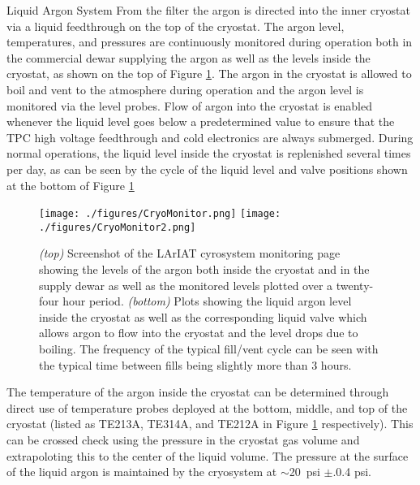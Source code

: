 \begin{subsubsection}{Liquid Argon System}
From the filter the argon is directed into the inner cryostat via a liquid feedthrough on the top of the cryostat. The argon level, temperatures, and pressures are continuously monitored during operation both in the commercial dewar supplying the argon as well as the levels inside the cryostat, as shown on the top of Figure \ref{fig:LArIATCryoMonitor}. The argon in the cryostat is allowed to boil and vent to the atmosphere during operation and the argon level is monitored via the level probes. Flow of argon into the cryostat is enabled whenever the liquid level goes below a predetermined value to ensure that the TPC high voltage feedthrough and cold electronics are always submerged. During normal operations, the liquid level inside the cryostat is replenished several times per day, as can be seen by the cycle of the liquid level and valve positions shown at the bottom of Figure \ref{fig:LArIATCryoMonitor} 

\begin{figure}[htb]
\centering
\texttt{[image: ./figures/CryoMonitor.png]}
\texttt{[image: ./figures/CryoMonitor2.png]}
\caption{\emph{(top)} Screenshot of the LArIAT cyrosystem monitoring page showing the levels of the argon both inside the cryostat and in the supply dewar as well as the monitored levels plotted over a twenty-four hour period. \emph{(bottom)} Plots showing the liquid argon level inside the cryostat as well as the corresponding liquid valve which allows argon to flow into the cryostat and the level drops due to boiling. The frequency of the typical fill/vent cycle can be seen with the typical time between fills being slightly more than 3 hours.}
\label{fig:LArIATCryoMonitor}
\end{figure}


The temperature of the argon inside the cryostat can be determined through direct use of temperature probes deployed at the bottom, middle, and top of the cryostat (listed as TE213A, TE314A, and TE212A in Figure \ref{fig:LArIATCryoMonitor} respectively). This can be crossed check using the pressure in the cryostat gas volume and extrapoloting this to the center of the liquid volume. The pressure at the surface of the liquid argon is maintained by the cryosystem at $\sim$20~psi $\pm$.0.4 psi.


\end{subsubsection}
